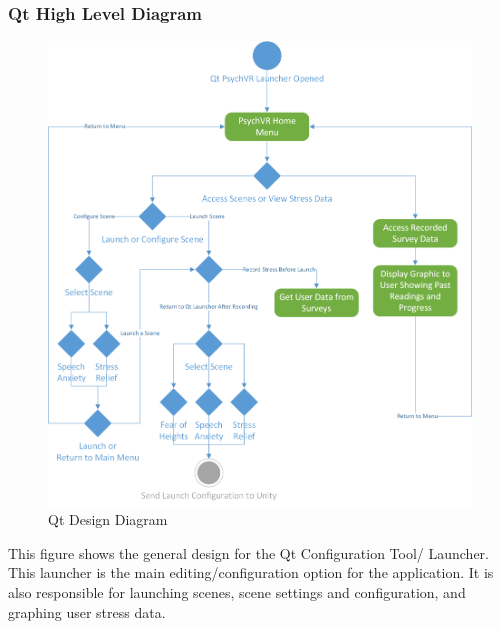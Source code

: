 \documentclass[a4paper,10pt]{article}
\begin{document}
		\subsubsection{Qt High Level Diagram}
		\begin{figure}[H]
			\includegraphics[width=\linewidth,height=\paperheight,keepaspectratio]{qtConfigDiag.png}
			\caption{Qt Design Diagram}
			\label{fig:qtHighLevel}
		\end{figure}
		This figure shows the general design for the Qt Configuration Tool/ Launcher. This launcher is the main editing/configuration option for the application. It is also responsible for launching scenes, scene settings and configuration, and graphing user stress data.

		\pagebreak
\end{document}
